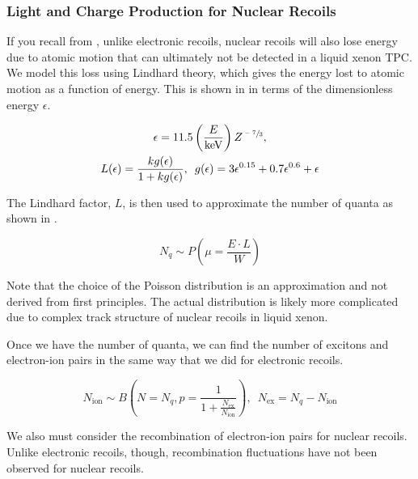 \subsubsection{Light and Charge Production for Nuclear Recoils}
\label{sec:xe1t_mc_observables_production_nr}

If you recall from , unlike electronic recoils, nuclear recoils will also lose energy due to atomic motion that can ultimately not be detected in a liquid xenon TPC.  We model this loss using Lindhard theory, which gives the energy lost to atomic motion as a function of energy.  This is shown in  in terms of the dimensionless energy $\epsilon$.

\begin{equation}
        \label{eqn:xe1t_lindhard}
        \begin{gathered}
                \epsilon = 11.5 \left( \frac{E}{\textrm{keV}} \right) Z^{\sfrac{-7}{3}}, \\
                L(\epsilon) = \frac{k g(\epsilon)}{1 + k g(\epsilon)}, \, \, \, g(\epsilon) = 3 \epsilon^{0.15} + 0.7 \epsilon^{0.6} + \epsilon
        \end{gathered}
\end{equation}

The Lindhard factor, $L$, is then used to approximate the number of quanta as shown in .

\begin{equation}
        \label{eqn:xe1t_nr_quanta}
        N_q \sim P \left( \mu = \frac{E \cdot L}{W} \right)
\end{equation}

Note that the choice of the Poisson distribution is an approximation and not derived from first principles.  The actual distribution is likely more complicated due to complex track structure of nuclear recoils in liquid xenon.

Once we have the number of quanta, we can find the number of excitons and electron-ion pairs in the same way that we did for electronic recoils.

\begin{equation}
        \label{eqn:xe1t_nr_exciton_ion}
        N_{\textrm{ion}} \sim B \left( N=N_q, p = \frac{1}{1 + \frac{N_{\textrm{ex}}}{N_{\textrm{ion}}}} \right) , \, \, \, N_{\textrm{ex}} = N_q - N_{\textrm{ion}}
\end{equation}


We also must consider the recombination of electron-ion pairs for nuclear recoils.  Unlike electronic recoils, though, recombination fluctuations have not been observed for nuclear recoils.


